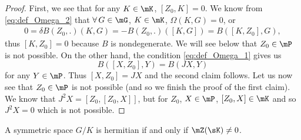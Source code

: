 \begin{proof}
	First, we see that for any $K\in\mK$, $[Z_0,K]=0$. We know from \eqref{eq:def_Omega_2} that $\forall\,G\in\mG$, $K\in\mK$, $\Omega(K,G)=0$, or
	\begin{equation}
		\begin{split}
			0=\delta B(Z_0,.)(K,G)=-B(Z_0,.)([K,G])
			=B([K,Z_0],G),
		\end{split}
	\end{equation}
	thus $[K,Z_0]=0$ because $B$ is nondegenerate. We will see below that $Z_0\in\mP$ is not possible.  On the other hand, the condition \eqref{eq:def_Omega_1} gives us
	\[
		B( [X,Z_0],Y )=B(JX,Y)
	\]
	for any $Y\in\mP$. Thus $[X,Z_0]=JX$ and the second claim follows. Let us now see that $Z_0\in\mP$ is not possible (and so we finish the proof of the first claim). We know that $J^2X=[Z_0,[Z_0,X]]$, but for $Z_0$, $X\in\mP$, $[Z_0,X]\in\mK$ and so $J^2X=0$ which is not possible.

\end{proof}


\begin{lemma}
	A symmetric space $G/K$ is hermitian if and only if $\mZ(\sK)\neq 0$.
\end{lemma}

